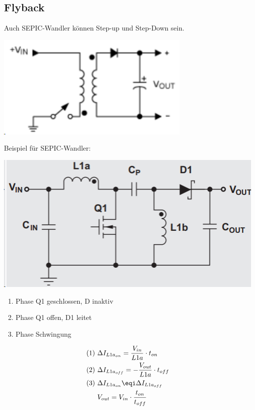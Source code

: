\subsection{Flyback}
Auch SEPIC-Wandler können Step-up und Step-Down sein.
\begin{center}
	\includegraphics[width=0.4\columnwidth]{Images/flyback}
\end{center}

Beispiel für SEPIC-Wandler:
\begin{center}
	\includegraphics[width=0.6\columnwidth]{Images/sepic}
\end{center}
\begin{enumerate}[nosep]
	\item Phase Q1 geschlossen, D inaktiv
	\item Phase Q1 offen, D1 leitet
	\item Phase Schwingung
\end{enumerate}
\begin{align*}
	\text{(1)  } & \Delta I_{L1a_{on}} = \frac{V_{in}}{L1a}\cdot t_{on}\\
	\text{(2)  } & \Delta I_{L1a_{off}} = -\frac{V_{out}}{L1a}\cdot t_{off}\\
	\text{(3)  } & \Delta I_{L1a_{on}} \eqi  \Delta I_{L1a_{off}}\\
	& V_{out} = V_{in} \cdot \frac{t_{on}}{t_{off}}
\end{align*}
